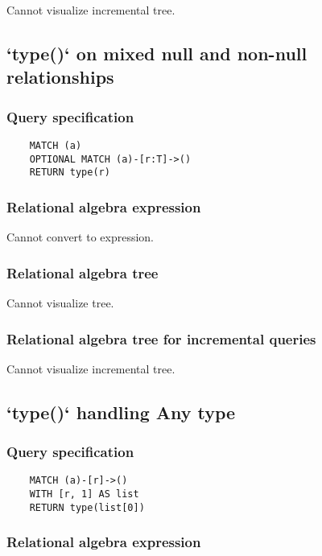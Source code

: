 	Cannot visualize incremental tree.
	\subsection{`type()` on mixed null and non-null relationships}

	\subsubsection*{Query specification}

	\begin{lstlisting}
	MATCH (a)
	OPTIONAL MATCH (a)-[r:T]->()
	RETURN type(r)
	\end{lstlisting}


	\subsubsection*{Relational algebra expression}

	Cannot convert to expression.

	\subsubsection*{Relational algebra tree}

	Cannot visualize tree.

	\subsubsection*{Relational algebra tree for incremental queries}

	Cannot visualize incremental tree.
	\subsection{`type()` handling Any type}

	\subsubsection*{Query specification}

	\begin{lstlisting}
	MATCH (a)-[r]->()
	WITH [r, 1] AS list
	RETURN type(list[0])
	\end{lstlisting}


	\subsubsection*{Relational algebra expression}

